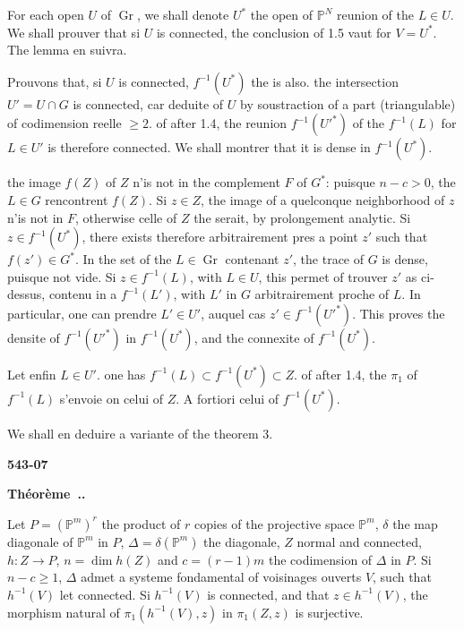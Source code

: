 \documentclass[12pt,a4paper]{article}
\newcounter{secitem}
\renewcommand{\thesecitem}{\thesection.\arabic{secitem}}
\newenvironment{sectheorem}{%
  \refstepcounter{secitem}%
  \par\medskip\noindent\textbf{Théorème~\thesecitem.}~\ignorespaces
}{\par\medskip}
\DeclareMathOperator{\Gr}{Gr}
\begin{document}
For each open $U$ of $\Gr$, we shall denote $U^*$ the open of $\mathbb{P}^N$ reunion of the $L \in U$. We shall prouver that si $U$ is connected, the conclusion of 1.5 vaut for $V = U^*$. The lemma en suivra.

Prouvons that, si $U$ is connected, $f^{-1}(U^*)$ the is also. the intersection $U' = U \cap G$ is connected, car deduite of $U$ by soustraction of a part (triangulable) of codimension reelle $\geq 2$. of after 1.4, the reunion $f^{-1}(U'^*)$ of the $f^{-1}(L)$ for $L \in U'$ is therefore connected. We shall montrer that it is dense in $f^{-1}(U^*)$.

the image $f(Z)$ of $Z$ n'is not in the complement $F$ of $G^*$: puisque $n - c > 0$, the $L \in G$ rencontrent $f(Z)$. Si $z \in Z$, the image of a quelconque neighborhood of $z$ n'is not in $F$, otherwise celle of $Z$ the serait, by prolongement analytic. Si $z \in f^{-1}(U^*)$, there exists therefore arbitrairement pres a point $z'$ such that $f(z') \in G^*$. In the set of the $L \in \Gr$ contenant $z'$, the trace of $G$ is dense, puisque not vide. Si $z \in f^{-1}(L)$, with $L \in U$, this permet of trouver $z'$ as ci-dessus, contenu in a $f^{-1}(L')$, with $L'$ in $G$ arbitrairement proche of $L$. In particular, one can prendre $L' \in U'$, auquel cas $z' \in f^{-1}(U'^*)$. This proves the densite of $f^{-1}(U'^*)$ in $f^{-1}(U^*)$, and the connexite of $f^{-1}(U^*)$.

Let enfin $L \in U'$. one has $f^{-1}(L) \subset f^{-1}(U^*) \subset Z$. of after 1.4, the $\pi_1$ of $f^{-1}(L)$ s'envoie on celui of $Z$. A fortiori celui of $f^{-1}(U^*)$.

We shall en deduire a variante of the theorem 3.

\newpage
\begin{flushright}
\textbf{543-07}
\end{flushright}

\begin{sectheorem}
Let $P = (\mathbb{P}^m)^r$ the product of $r$ copies of the projective space $\mathbb{P}^m$, $\delta$ the map diagonale of $\mathbb{P}^m$ in $P$, $\Delta = \delta(\mathbb{P}^m)$ the diagonale, $Z$ normal and connected, $h : Z \to P$, $n = \dim h(Z)$ and $c = (r-1)m$ the codimension of $\Delta$ in $P$. Si $n - c \geq 1$, $\Delta$ admet a systeme fondamental of voisinages ouverts $V$, such that $h^{-1}(V)$ let connected. Si $h^{-1}(V)$ is connected, and that $z \in h^{-1}(V)$, the morphism natural of $\pi_1(h^{-1}(V), z)$ in $\pi_1(Z, z)$ is surjective.
\end{sectheorem}
\end{document}
